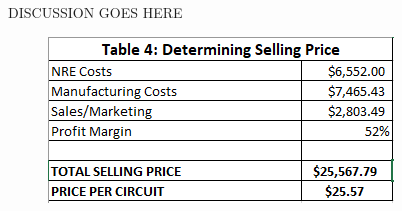 

DISCUSSION GOES HERE


\begin{figure}[H]
	\centering
	\includegraphics[width=0.7\linewidth]{tablecost}
	\caption[Cost Analysis Table]{}
	\caption{}
	\label{fig:tablecost}
\end{figure}


